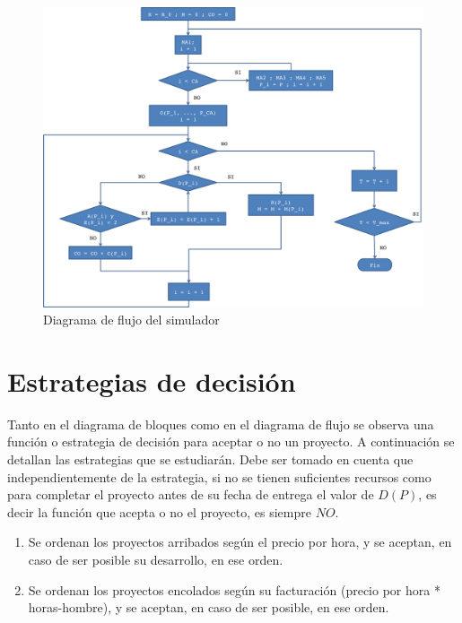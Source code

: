 \begin{figure}[H]
\begin{center}
 \includegraphics[width=\textwidth,height=\textheight,keepaspectratio]{./images/flujo.png}
\end{center}

\caption{Diagrama de flujo del simulador}
\label{fig:flujo}
\end{figure}

\section{Estrategias de decisión}

Tanto en el diagrama de bloques como en el diagrama de flujo se observa una función o estrategia de decisión para aceptar o no un proyecto. A continuación se detallan 
las estrategias que se estudiarán. Debe ser tomado en cuenta que independientemente de la estrategia, si no se tienen suficientes recursos como para completar el proyecto 
antes de su fecha de entrega el valor de $D(P)$, es decir la función que acepta o no el proyecto, es siempre $NO$.

\begin{enumerate}
    \item Se ordenan los proyectos arribados según el precio por hora, y se aceptan, en caso de ser posible su desarrollo, en ese orden.\\

    \item Se ordenan los proyectos encolados según su facturación (precio por hora * horas-hombre), y se aceptan, en caso de ser posible, en ese orden.\\
\end{enumerate}



